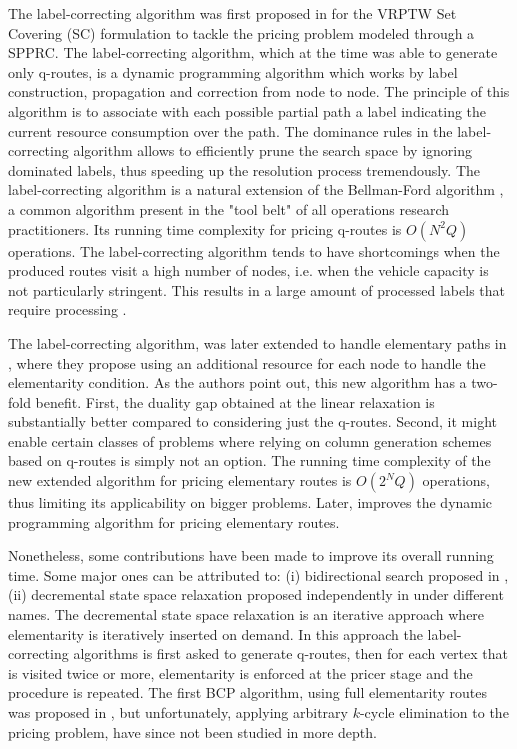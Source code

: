 The label-correcting algorithm was first proposed in \textcite{desrochers1992}
for the VRPTW Set Covering (SC) formulation
to tackle the pricing problem modeled through a SPPRC.
The label-correcting algorithm, which at the time was able to generate only q-routes,
is a dynamic programming algorithm
which works by label construction, propagation and correction from node to node.
The principle of this algorithm is to associate with each possible partial
path a label indicating the current resource consumption over the path.
The dominance rules in the label-correcting algorithm allows
to efficiently prune the search space by ignoring dominated labels, thus speeding
up the resolution process tremendously.
The label-correcting algorithm
is a natural extension of the Bellman-Ford algorithm \parencite{bellman1958, fordjr1956},
a common algorithm present in the "tool belt" of all operations research practitioners.
Its running time complexity for pricing q-routes is $O(N^2 Q)$ operations.
The label-correcting algorithm tends to have shortcomings when the
produced routes visit a high number of nodes,
i.e. when the vehicle capacity is not particularly stringent.
This results in a large amount of processed labels that require processing \parencite{jepsen2008a}.

The label-correcting algorithm, was later extended to handle
elementary paths in \textcite{feillet2004},
where they propose using an additional resource for each node
to handle the elementarity condition.
As the authors point out, this new algorithm has a two-fold benefit.
First, the duality gap obtained at the linear relaxation is substantially better
compared to considering just the q-routes.
Second, it might enable certain classes of problems where relying
on column generation schemes based on q-routes is simply not an option.
The running time complexity of the new extended algorithm for pricing elementary routes
is $O(2^N Q)$ operations,
thus limiting its applicability on bigger problems.
Later, \textcite{righini2006} improves the dynamic programming
algorithm for pricing elementary routes.

Nonetheless, some contributions have been made to improve its overall running time.
Some major ones can be attributed to:
(i) bidirectional search proposed in \textcite{righini2006},
(ii) decremental state space relaxation proposed independently in
\textcite{boland2006, righini2008} under different names.
The decremental state space relaxation is an iterative
approach where elementarity is iteratively inserted on demand.
In this approach the label-correcting algorithms
is first asked to generate q-routes, then for each vertex that is visited
twice or more, elementarity is enforced at the pricer stage
and the procedure is repeated.
The first BCP algorithm, using full elementarity routes
was proposed in \cite{chabrier2006}, but unfortunately,
applying arbitrary $k$-cycle elimination to the pricing problem,
have since not been studied in more depth.


